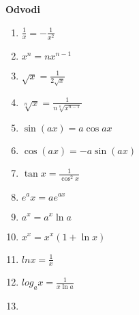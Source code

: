 
\textbf{Odvodi}
\begin{center}
	\begin{small}
		\begin{enumerate}
			\item \begin{math}
				      \frac{1}{x} = -\frac{1}{x^2}
			      \end{math}
			\item \begin{math}
				      x^n  = nx^{n-1}
			      \end{math}
			\item \begin{math}
				      \sqrt{x} = \frac{1}{2 \sqrt{x}}
			      \end{math}
			\item \begin{math}
				      \sqrt[n] x = \frac{1}{n \sqrt[n]{x^{n-1}}}
			      \end{math}
			\item \begin{math}
				      \sin (a x) =  a  \cos a x
			      \end{math}
			\item  \begin{math}
				      \cos (a x) = - a \sin (a x)
			      \end{math}
			\item \begin{math}
				      \tan x = \frac{1}{\cos^2 x}
			      \end{math}
			\item \begin{math}
				      e^ax = ae^{ax}
			      \end{math}
			\item \begin{math}
				      a^x = a^x \ln a
			      \end{math}
			\item \begin{math}
				      x^x = x^x (1+\ln x)
			      \end{math}
			\item \begin{math}
				      ln x = \frac{1}{x}
			      \end{math}
			\item \begin{math}
				      log_a x = \frac{1}{x \ln a}
			      \end{math}
			\item \begin{math}

\end{math}
\end{enumerate}
\end{small}
\end{center}

